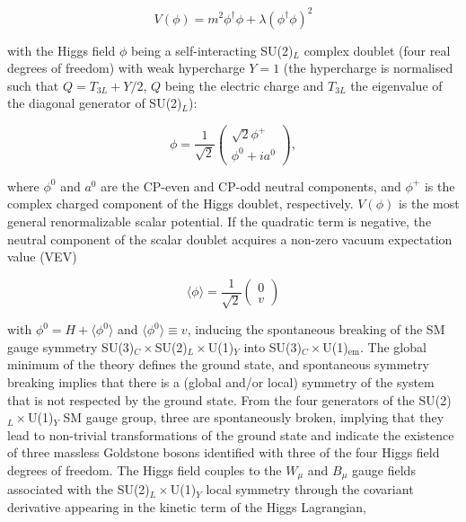 \documentclass[12pt]{article}
\begin{document}
\begin{equation}
    V (\phi) = m^2\phi^\dagger\phi + \lambda(\phi^\dagger\phi)^2
\end{equation}

with the Higgs field $\phi$ being a self-interacting SU(2)$_L$ complex doublet (four real degrees of freedom) with weak hypercharge $Y = 1$ (the hypercharge is normalised such that $Q = T_{3L} + Y /2$, $Q$ being the electric charge and $T_{3L}$ the eigenvalue of the diagonal generator of SU(2)$_L$):

\begin{equation}
    \phi = \frac{1}{\sqrt{2}}
    \begin{pmatrix}
        \sqrt{2}\phi^+ \\
        \phi^0 + ia^0
    \end{pmatrix},
\end{equation}

where $\phi^0$ and $a^0$ are the CP-even and CP-odd neutral components, and $\phi^+$ is the complex charged component of the Higgs doublet, respectively. $V(\phi)$ is the most general renormalizable scalar potential. If the quadratic term is negative, the neutral component of the scalar doublet acquires a non-zero vacuum expectation value (VEV)

\begin{equation}
    \langle\phi\rangle = \frac{1}{\sqrt{2}}
    \begin{pmatrix}
        0 \\ v
    \end{pmatrix}
\end{equation}

with $\phi^0 = H+\langle\phi^0\rangle$ and $\langle\phi^0\rangle \equiv v$, inducing the spontaneous breaking of the SM gauge symmetry SU(3)$_C\times$SU(2)$_L\times$U(1)$_Y$ into SU(3)$_C\times$U(1)$_\text{em}$. The global minimum of the theory defines the ground state, and spontaneous symmetry breaking implies that there is a (global and/or local) symmetry of the system that is not respected by the ground state. From the four generators of the SU(2)$_L\times$U(1)$_Y$ SM gauge group, three are spontaneously broken, implying that they lead to non-trivial transformations of the ground state and indicate the existence of three massless Goldstone bosons identified with three of the four Higgs field degrees of freedom. The Higgs field couples to the $W_\mu$ and $B_\mu$ gauge fields associated with the SU(2)$_L\times$U(1)$_Y$ local symmetry through the covariant derivative appearing in the kinetic term of the Higgs Lagrangian,
\end{document}
